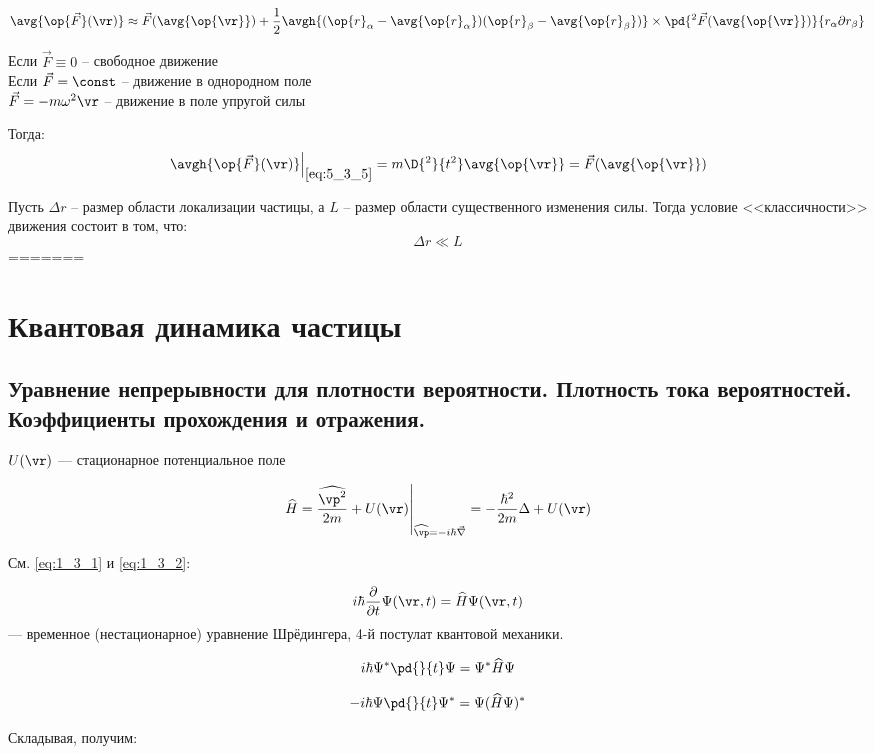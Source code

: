 \begin{equation}
\label{eq:5_3_8}
\avg{\op{\vec{F}}(\vr)} \approx \vec{F}(\avg{\op{\vr}}) + \frac{1}{2} \avgh{(\op{r}_\alpha - \avg{\op{r}_\alpha})(\op{r}_\beta - \avg{\op{r}_\beta})} \times \pd{^2 \vec{F}(\avg{\op{\vr}})}{r_\alpha \partial r_\beta}
\end{equation}

\noindent
Если $\vec{F} \equiv 0$ -- свободное движение\\
Если $\vec{F} = \const$ -- движение в однородном поле\\
$\vec{F} = - m\omega^2 \vr$ -- движение в поле упругой силы

Тогда:
\begin{equation}
\label{eq:5_3_9}
\left. \avgh{\op{\vec{F}}(\vr)} \right|_{\eqref{eq:5_3_5}} = m \D{^2}{t^2} \avg{\op{\vr}} = \vec{F}(\avg{\op{\vr}})
\end{equation}

Пусть $\Delta r$ -- размер области локализации частицы, а $L$ -- размер области существенного изменения силы. Тогда условие <<классичности>> движения состоит в том, что:
\begin{equation}
\label{eq:5_3_10}
\Delta r \ll L
\end{equation}
=======
\chapter{Квантовая динамика частицы}

\section{Уравнение непрерывности для плотности вероятности. Плотность тока вероятностей. Коэффициенты прохождения и отражения.}

$U(\vr)$ --- стационарное потенциальное поле

$$\left. \widehat{H}=\frac{\widehat{\vp^2}}{2m}+U(\vr) \right|_{\widehat{\vp}=-i\hbar\vec{\nabla}} =-\frac{\hbar^2}{2m}\Delta+U(\vr)$$

См. \eqref{eq:1_3_1} и \eqref{eq:1_3_2}:

$$i\hbar\frac{\partial}{\partial{t}}\Psi(\vr,t)=\widehat{H}\Psi(\vr,t)$$
--- временное (нестационарное) уравнение Шрёдингера, 4-й постулат квантовой механики.

$$i\hbar\Psi^*\pd{}{t}\Psi=\Psi^*\widehat{H}\Psi$$

$$-i\hbar\Psi\pd{}{t}\Psi^*=\Psi(\widehat{H}\Psi)^*$$

Складывая, получим:

